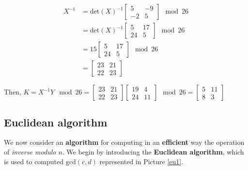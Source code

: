 \begin{equation*}
    \begin{align*}
        X^{-1} &= \text{det}(X)^{-1} \begin{bmatrix}
5 & -9 \\ -2 & 5 
\end{bmatrix} \mod 26 \\ &= \text{det}(X)^{-1} \begin{bmatrix}
5 & 17 \\
24 & 5 
\end{bmatrix} \mod 26 \\ &= 15  \begin{bmatrix}
5 & 17 \\
24 & 5 
\end{bmatrix} \mod 26 \\ &= \begin{bmatrix}
23 & 21 \\
22 & 23 
\end{bmatrix}      
    \end{align*}
\end{equation*}

Then, $K = X^{-1}Y \mod 26 = \begin{bmatrix}
23 & 21 \\
22 & 23 
\end{bmatrix} \begin{bmatrix}
19 & 4 \\
24 & 11 
\end{bmatrix} \mod 26 = \begin{bmatrix}
5 & 11 \\
8 & 3 
\end{bmatrix}$

\subsection{Euclidean algorithm}
We now consider an \textbf{algorithm} for computing in an \textbf{efficient} way the operation of \textit{inverse modulo $n$}. We begin by introducing the \textbf{Euclidean algorithm}, which is used to computed $\text{gcd}(c,d)$ represented in Picture \ref{eu1}.

